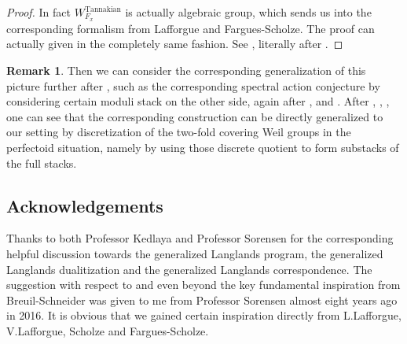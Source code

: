 \documentclass[12pt]{book}
\theoremstyle{definition}
\newtheorem{remark}{Remark}
\begin{document}
\begin{proof}
In fact $W^\mathrm{Tannakian}_{F_x}$ is actually algebraic group, which sends us into the corresponding formalism from Lafforgue and Fargues-Scholze. The proof can actually given in the completely same fashion. See \cite[Chapter VIII Theorem 4.1 and Chapter IX Proposition 4.1]{FS}, literally after \cite{VLa}.
\end{proof}


\begin{remark}
Then we can consider the corresponding generalization of this picture further after \cite{FS}, such as the corresponding spectral action conjecture by considering certain moduli stack on the other side, again after \cite{AI}, \cite{KI} and \cite{KXII}. After \cite{DHKM}, \cite{FS}, \cite{Z}, one can see that the corresponding construction can be directly generalized to our setting by discretization of the two-fold covering Weil groups in the perfectoid situation, namely by using those discrete quotient to form substacks of the full stacks.
\end{remark}






\newpage
\subsection*{Acknowledgements}
Thanks to both Professor Kedlaya and Professor Sorensen for the corresponding helpful discussion towards the generalized Langlands program, the generalized Langlands dualitization and the generalized Langlands correspondence. The suggestion with respect to and even beyond the key fundamental inspiration from Breuil-Schneider was given to me from Professor Sorensen almost eight years ago in 2016. It is obvious that we gained certain inspiration directly from L.Lafforgue, V.Lafforgue, Scholze and Fargues-Scholze.
\end{document}
